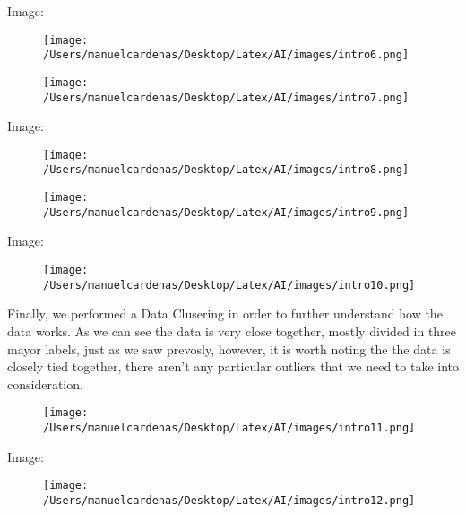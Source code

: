\documentclass{article}
\begin{document}
    Image:\pagebreak

    \begin{figure}[h]
        \centering
        \texttt{[image: /Users/manuelcardenas/Desktop/Latex/AI/images/intro6.png]}
        \label{fig:intro6}
    \end{figure}

    

    \begin{figure}[h]
        \centering
        \texttt{[image: /Users/manuelcardenas/Desktop/Latex/AI/images/intro7.png]}
        \label{fig:intro7}
    \end{figure}

    Image:\pagebreak

    \begin{figure}[h]
        \centering
        \texttt{[image: /Users/manuelcardenas/Desktop/Latex/AI/images/intro8.png]}
        \label{fig:intro8}
    \end{figure}

    

    \begin{figure}[h]
        \centering
        \texttt{[image: /Users/manuelcardenas/Desktop/Latex/AI/images/intro9.png]}
        \label{fig:intro9}
    \end{figure}

    Image:\pagebreak

    \begin{figure}[h]
        \centering
        \texttt{[image: /Users/manuelcardenas/Desktop/Latex/AI/images/intro10.png]}
        \label{fig:intro10}
    \end{figure}


    Finally, we performed a Data Clusering in order to further understand how the data works.
    As we can see the data is very close together, mostly divided in three mayor labels, just as we saw prevosly, 
    however, it is worth noting the the data is closely tied together, there aren't any particular outliers that we need 
    to take into consideration.
    \begin{figure}[h]
        \centering
        \texttt{[image: /Users/manuelcardenas/Desktop/Latex/AI/images/intro11.png]}
        \label{fig:intro11}
    \end{figure}

    Image:\pagebreak

    \begin{figure}[h]
        \centering
        \texttt{[image: /Users/manuelcardenas/Desktop/Latex/AI/images/intro12.png]}
        \label{fig:intro12}
    \end{figure}
\end{document}
